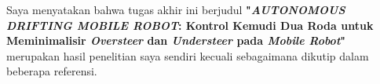 
\begin{declaration}


Saya menyatakan bahwa tugas akhir ini berjudul \textbf{"\textit{AUTONOMOUS DRIFTING MOBILE ROBOT}: Kontrol Kemudi Dua Roda untuk Meminimalisir \textit{Oversteer} dan \textit{Understeer} pada \textit{Mobile Robot}"} merupakan hasil penelitian saya sendiri kecuali sebagaimana dikutip dalam beberapa referensi.


\end{declaration}

